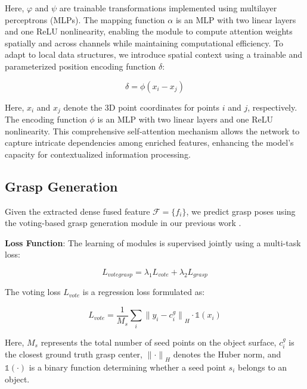 \noindent Here, $\varphi$ and $\psi$ are trainable transformations implemented using multilayer perceptrons (MLPs). The mapping function $\alpha$ is an MLP with two linear layers and one ReLU nonlinearity, enabling the module to compute attention weights spatially and across channels while maintaining computational efficiency. To adapt to local data structures, we introduce spatial context using a trainable and parameterized position encoding function $\delta$:

\begin{equation}
\delta = \phi(x_i - x_j)
\end{equation}

\noindent Here, $x_i$ and $x_j$ denote the 3D point coordinates for points $i$ and $j$, respectively. The encoding function $\phi$ is an MLP with two linear layers and one ReLU nonlinearity. This comprehensive self-attention mechanism allows the network to capture intricate dependencies among enriched features, enhancing the model's capacity for contextualized information processing.

\subsection{Grasp Generation}

Given the extracted dense fused feature $\mathcal{F}=\lbrace{f_i}\rbrace$, we predict grasp poses using the voting-based grasp generation module in our previous work \cite{hoang2023grasp}.

\textbf{Loss Function}: The learning of modules is supervised jointly using a multi-task loss:

\begin{equation}
L_{votegrasp} = \lambda_1 L_{vote} + \lambda_2 L_{grasp}
\label{eq:L_votegrasp_v2}
\end{equation}

The voting loss $L_{vote}$ is a regression loss formulated as:

\begin{equation}
L_{vote} = \frac{1}{M_s} \sum_{i}^{} {\lVert y_i - c^g_i \rVert}_H \cdot \mathds{1}(x_i)
\end{equation}

Here, $M_s$ represents the total number of seed points on the object surface, $c^g_i$ is the closest ground truth grasp center, ${\lVert \cdot \rVert}_H$ denotes the Huber norm, and $\mathds{1}(\cdot)$ is a binary function determining whether a seed point $s_i$ belongs to an object.

